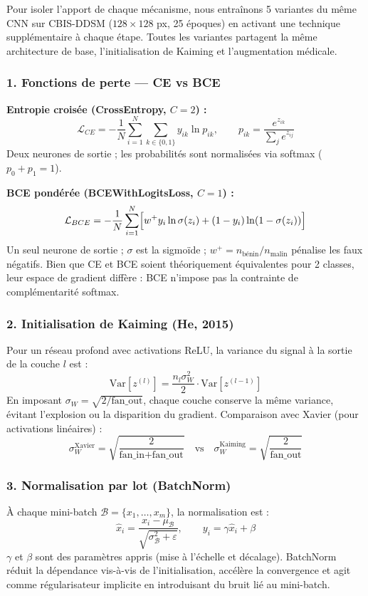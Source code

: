 \documentclass[a4paper,10pt]{article}
\begin{document}
Pour isoler l'apport de chaque mécanisme, nous entraînons 5 variantes du même CNN
sur CBIS-DDSM ($128 \times 128$ px, 25 époques) en activant une technique supplémentaire à chaque étape.
Toutes les variantes partagent la même architecture de base, l'initialisation de Kaiming
et l'augmentation médicale.

\subsubsection*{1. Fonctions de perte — CE vs BCE}

\textbf{Entropie croisée (CrossEntropy, $C=2$) :}
\[
\mathcal{L}_{CE} = -\frac{1}{N}\sum_{i=1}^{N}\sum_{k \in \{0,1\}} y_{ik}\ln p_{ik},
\qquad p_{ik} = \frac{e^{z_{ik}}}{\sum_j e^{z_{ij}}}
\]
Deux neurones de sortie ; les probabilités sont normalisées via softmax ($p_0 + p_1 = 1$).

\textbf{BCE pondérée (BCEWithLogitsLoss, $C=1$) :}
\[
\mathcal{L}_{BCE} = -\frac{1}{N}\sum_{i=1}^{N}
\Bigl[w^{+} y_i \ln\sigma(z_i) + (1-y_i)\ln(1-\sigma(z_i))\Bigr]
\]
Un seul neurone de sortie ; $\sigma$ est la sigmoïde ; $w^{+} = n_{\text{bénin}} / n_{\text{malin}}$
pénalise les faux négatifs. Bien que CE et BCE soient théoriquement équivalentes pour 2 classes,
leur espace de gradient diffère : BCE n'impose pas la contrainte de complémentarité softmax.

\subsubsection*{2. Initialisation de Kaiming (He, 2015)}

Pour un réseau profond avec activations ReLU, la variance du signal à la sortie de la couche $l$ est :
\[
\mathrm{Var}[z^{(l)}] = \frac{n_l \sigma_W^2}{2} \cdot \mathrm{Var}[z^{(l-1)}]
\]
En imposant $\sigma_W = \sqrt{2 / \text{fan\_out}}$, chaque couche conserve la même variance,
évitant l'explosion ou la disparition du gradient.
Comparaison avec Xavier (pour activations linéaires) :
\[
\sigma_W^{\text{Xavier}} = \sqrt{\frac{2}{\text{fan\_in} + \text{fan\_out}}}
\quad \text{vs} \quad
\sigma_W^{\text{Kaiming}} = \sqrt{\frac{2}{\text{fan\_out}}}
\]

\subsubsection*{3. Normalisation par lot (BatchNorm)}

À chaque mini-batch $\mathcal{B} = \{x_1, \ldots, x_m\}$, la normalisation est :
\[
\hat{x}_i = \frac{x_i - \mu_{\mathcal{B}}}{\sqrt{\sigma_{\mathcal{B}}^2 + \varepsilon}},
\qquad y_i = \gamma \hat{x}_i + \beta
\]
$\gamma$ et $\beta$ sont des paramètres appris (mise à l'échelle et décalage).
BatchNorm réduit la dépendance vis-à-vis de l'initialisation, accélère la convergence
et agit comme régularisateur implicite en introduisant du bruit lié au mini-batch.
\end{document}
